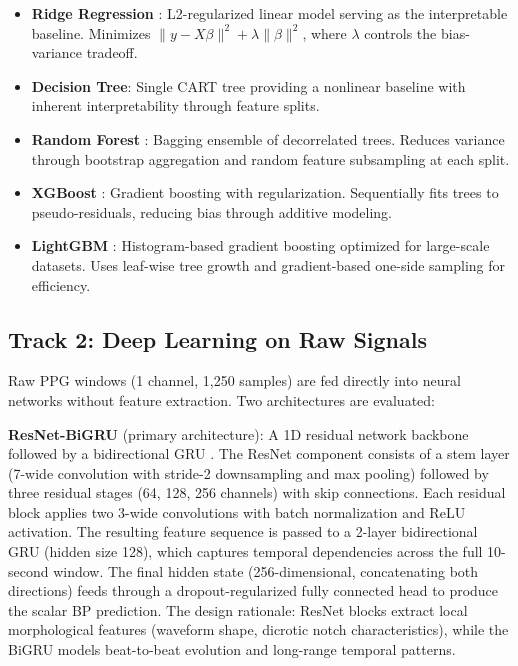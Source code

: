 \documentclass[11pt]{article}
\begin{document}
\begin{itemize}[nosep]
    \item \textbf{Ridge Regression} \citep{hoerl1970ridge}: L2-regularized linear model serving as the interpretable baseline. Minimizes $\|y - X\beta\|^2 + \lambda\|\beta\|^2$, where $\lambda$ controls the bias-variance tradeoff.
    \item \textbf{Decision Tree}: Single CART tree providing a nonlinear baseline with inherent interpretability through feature splits.
    \item \textbf{Random Forest} \citep{breiman2001random}: Bagging ensemble of decorrelated trees. Reduces variance through bootstrap aggregation and random feature subsampling at each split.
    \item \textbf{XGBoost} \citep{chen2016xgboost}: Gradient boosting with regularization. Sequentially fits trees to pseudo-residuals, reducing bias through additive modeling.
    \item \textbf{LightGBM} \citep{ke2017lightgbm}: Histogram-based gradient boosting optimized for large-scale datasets. Uses leaf-wise tree growth and gradient-based one-side sampling for efficiency.
\end{itemize}

\subsection{Track 2: Deep Learning on Raw Signals}

Raw PPG windows (1 channel, 1,250 samples) are fed directly into neural networks without feature extraction. Two architectures are evaluated:

\textbf{ResNet-BiGRU} (primary architecture): A 1D residual network backbone \citep{he2016resnet} followed by a bidirectional GRU \citep{cho2014gru}. The ResNet component consists of a stem layer (7-wide convolution with stride-2 downsampling and max pooling) followed by three residual stages (64, 128, 256 channels) with skip connections. Each residual block applies two 3-wide convolutions with batch normalization and ReLU activation. The resulting feature sequence is passed to a 2-layer bidirectional GRU (hidden size 128), which captures temporal dependencies across the full 10-second window. The final hidden state (256-dimensional, concatenating both directions) feeds through a dropout-regularized fully connected head to produce the scalar BP prediction. The design rationale: ResNet blocks extract local morphological features (waveform shape, dicrotic notch characteristics), while the BiGRU models beat-to-beat evolution and long-range temporal patterns.
\end{document}
